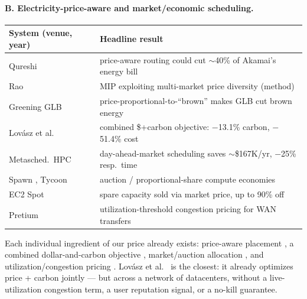 \documentclass{article}
\begin{document}
\paragraph{B. Electricity-price-aware and market/economic scheduling.}
\begin{center}
\begin{tabular}{>{\raggedright\arraybackslash}p{4.6cm}>{\raggedright\arraybackslash}p{8.4cm}}
\hline
\textbf{System (venue, year)} & \textbf{Headline result} \\
\hline
Qureshi \cite{r20} & price-aware routing could cut $\sim$40\% of Akamai's energy bill \\
Rao \cite{r21} & MIP exploiting multi-market price diversity (method) \\
Greening GLB \cite{r22} & price-proportional-to-``brown'' makes GLB cut brown energy \\
Lov\'asz et al.\ \cite{r23} & combined \$+carbon objective: $-$13.1\% carbon, $-$51.4\% cost \\
Metasched.\ HPC \cite{r24} & day-ahead-market scheduling saves $\sim$\$167K/yr, $-$25\% resp.\ time \\
Spawn \cite{r25}, Tycoon \cite{r26} & auction / proportional-share compute economies \\
EC2 Spot \cite{r27} & spare capacity sold via market price, up to 90\% off \\
Pretium \cite{r28} & utilization-threshold congestion pricing for WAN transfers \\
\hline
\end{tabular}
\end{center}
Each individual ingredient of our price already exists: price-aware placement
\cite{r20,r21}, a combined dollar-and-carbon objective \cite{r23}, market/auction
allocation \cite{r25,r26,r27}, and utilization/congestion pricing \cite{r28}.
Lov\'asz et al.\ \cite{r23} is the closest: it already optimizes price + carbon
jointly --- but across a network of datacenters, without a live-utilization
congestion term, a user reputation signal, or a no-kill guarantee.
\end{document}
